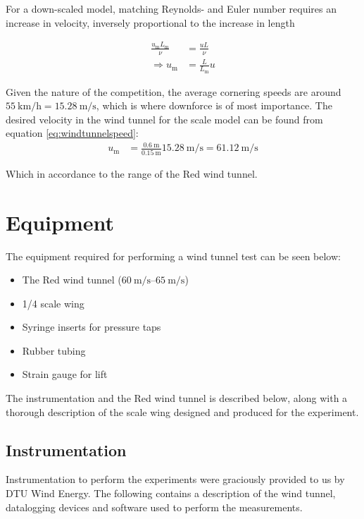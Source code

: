    For a down-scaled model, matching Reynolds- and Euler number requires an increase in velocity, inversely proportional to the increase in length 

    \begin{align}
      \frac{u_\text{m} L_\text{m}}{\nu} &= \frac{u L}{\nu} \nonumber \\
      \Rightarrow u_\text{m} &= \frac{L}{L_\text{m}} u \label{eq:windtunnelspeed}
    \end{align}

    Given the nature of the competition, the average cornering speeds are around $\SI{55}{\kilo \meter \per \hour} = \SI{15.28}{\metre\per\second}$, which is where downforce is of most importance. The desired velocity in the wind tunnel for the scale model can be found from equation \ref{eq:windtunnelspeed}:
    \begin{align*}
      u_\text{m} &= \frac{\SI{0.6}{\metre}}{\SI{0.15}{\metre}} \SI{15.28}{\metre\per\second} = \SI{61.12}{\metre\per\second}
    \end{align*}

    Which in accordance to the range of the Red wind tunnel.

\section{Equipment}

  The equipment required for performing a wind tunnel test can be seen below:
  \begin{itemize}
    \item The Red wind tunnel ($\SIrange{60}{65}{\metre\per\second}$)
    \item 1/4 scale wing
    \item Syringe inserts for pressure taps
    \item Rubber tubing
    \item Strain gauge for lift
  \end{itemize}

  The instrumentation and the Red wind tunnel is described below, along with a thorough description of the scale wing designed and produced for the experiment.

  \subsection{Instrumentation}

    Instrumentation to perform the experiments were graciously provided to us by DTU Wind Energy. The following contains a description of the wind tunnel, datalogging devices and software used to perform the measurements.

